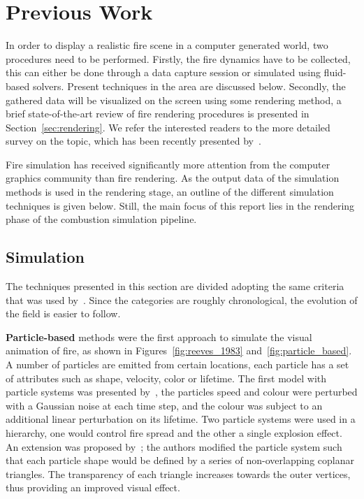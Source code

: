 \chapter{Previous Work}
\label{ch:previous_work}

In order to display a realistic fire scene in a computer generated world, two procedures need to be performed.
Firstly, the fire dynamics have to be collected, this can either be done through a data capture session or simulated using fluid-based solvers.
Present techniques in the area are discussed below. 
Secondly, the gathered data will be visualized on the screen using some rendering method, a brief state-of-the-art review of fire rendering procedures is presented in Section~\ref{sec:rendering}.
We refer the interested readers to the more detailed survey on the topic, which has been recently presented by~\cite{Huang:2014}.

Fire simulation has received significantly more attention from the computer graphics community than fire rendering.
As the output data of the simulation methods is used in the rendering stage, an outline of the different simulation techniques is given below. 
Still, the main focus of this report lies in the rendering phase of the combustion simulation pipeline.

\section{Simulation}
\label{sec:simulation}


The techniques presented in this section are divided adopting the same criteria that was used by~\cite{Huang:2014}.
Since the categories are roughly chronological, the evolution of the field is easier to follow.

\textbf{Particle-based} methods were the first approach to simulate the visual animation of fire, as shown in Figures~\ref{fig:reeves_1983} and~\ref{fig:particle_based}.
A number of particles are emitted from certain locations, each particle has a set of attributes such as shape, velocity, color or lifetime.
The first model with particle systems was presented by~\cite{Reeves:1983}, the particles speed and colour were perturbed with a Gaussian noise at each time step, and the colour was subject to an additional linear perturbation on its lifetime.
Two particle systems were used in a hierarchy, one would control fire spread and the other a single explosion effect.
An extension was proposed by~\cite{Perry:1994}; the authors modified the particle system such that each particle shape would be defined by a series of non-overlapping coplanar triangles.
The transparency of each triangle increases towards the outer vertices, thus providing an improved visual effect.


